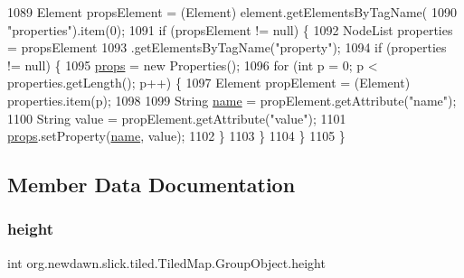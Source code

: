 \begin{DoxyCode}
1089             Element propsElement = (Element) element.getElementsByTagName(
1090                     \textcolor{stringliteral}{"properties"}).item(0);
1091             \textcolor{keywordflow}{if} (propsElement != null) \{
1092                 NodeList properties = propsElement
1093                         .getElementsByTagName(\textcolor{stringliteral}{"property"});
1094                 \textcolor{keywordflow}{if} (properties != null) \{
1095                     \mbox{\hyperlink{classorg_1_1newdawn_1_1slick_1_1tiled_1_1_tiled_map_1_1_group_object_a63381a58364283a036c59d7f40c1b575}{props}} = \textcolor{keyword}{new} Properties();
1096                     \textcolor{keywordflow}{for} (\textcolor{keywordtype}{int} p = 0; p < properties.getLength(); p++) \{
1097                         Element propElement = (Element) properties.item(p);
1098 
1099                         String \mbox{\hyperlink{classorg_1_1newdawn_1_1slick_1_1tiled_1_1_tiled_map_1_1_group_object_a647061794f0489797202fc8eab87203e}{name}} = propElement.getAttribute(\textcolor{stringliteral}{"name"});
1100                         String value = propElement.getAttribute(\textcolor{stringliteral}{"value"});
1101                         \mbox{\hyperlink{classorg_1_1newdawn_1_1slick_1_1tiled_1_1_tiled_map_1_1_group_object_a63381a58364283a036c59d7f40c1b575}{props}}.setProperty(\mbox{\hyperlink{classorg_1_1newdawn_1_1slick_1_1tiled_1_1_tiled_map_1_1_group_object_a647061794f0489797202fc8eab87203e}{name}}, value);
1102                     \}
1103                 \}
1104             \}
1105         \}
\end{DoxyCode}


\subsection{Member Data Documentation}
\mbox{\label{classorg_1_1newdawn_1_1slick_1_1tiled_1_1_tiled_map_1_1_group_object_a4d0f25828c9cff534be4ee5c889d6230}} 
\subsubsection{\texorpdfstring{height}{height}}
{\footnotesize\ttfamily int org.\+newdawn.\+slick.\+tiled.\+Tiled\+Map.\+Group\+Object.\+height}

